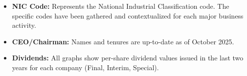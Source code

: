 \documentclass[12pt, a4paper]{report}
\begin{document}
\begin{itemize}
    \item \textbf{NIC Code:} Represents the National Industrial Classification code. The specific codes have been gathered and contextualized for each major business activity.
    
    \item \textbf{CEO/Chairman:} Names and tenures are up-to-date as of October 2025.
    
    \item \textbf{Dividends:} All graphs show per-share dividend values issued in the last two years for each company (Final, Interim, Special).
\end{itemize}
\end{document}
